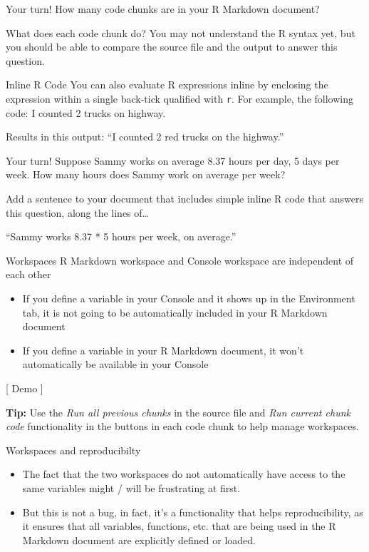 \documentclass[
  ignorenonframetext,
]{beamer}
\begin{document}
\begin{frame}{Your turn!}
\protect\hypertarget{your-turn-1}{}
How many code chunks are in your R Markdown document?

What does each code chunk do? You may not understand the R syntax yet,
but you should be able to compare the source file and the output to
answer this question.
\end{frame}

\begin{frame}[fragile]{Inline R Code}
\protect\hypertarget{inline-r-code}{}
You can also evaluate R expressions inline by enclosing the expression
within a single back-tick qualified with \texttt{r}. For example, the
following code: I counted 2 trucks on highway.

Results in this output: ``I counted 2 red trucks on the highway.''
\end{frame}

\begin{frame}{Your turn!}
\protect\hypertarget{your-turn-2}{}
Suppose Sammy works on average 8.37 hours per day, 5 days per week. How
many hours does Sammy work on average per week?

Add a sentence to your document that includes simple inline R code that
answers this question, along the lines of\ldots{}

``Sammy works 8.37 * 5 hours per week, on average.''
\end{frame}

\begin{frame}{Workspaces}
\protect\hypertarget{workspaces}{}
R Markdown workspace and Console workspace are independent of each other

\begin{itemize}
\item
  If you define a variable in your Console and it shows up in the
  Environment tab, it is not going to be automatically included in your
  R Markdown document
\item
  If you define a variable in your R Markdown document, it won't
  automatically be available in your Console
\end{itemize}

{[} Demo {]}

\textbf{Tip:} Use the \emph{Run all previous chunks} in the source file
and \emph{Run current chunk code} functionality in the buttons in each
code chunk to help manage workspaces.
\end{frame}

\begin{frame}{Workspaces and reproducibilty}
\protect\hypertarget{workspaces-and-reproducibilty}{}
\begin{itemize}
\item
  The fact that the two workspaces do not automatically have access to
  the same variables might / will be frustrating at first.
\item
  But this is not a bug, in fact, it's a functionality that helps
  reproducibility, as it ensures that all variables, functions, etc.
  that are being used in the R Markdown document are explicitly defined
  or loaded.
\end{itemize}
\end{frame}
\end{document}
